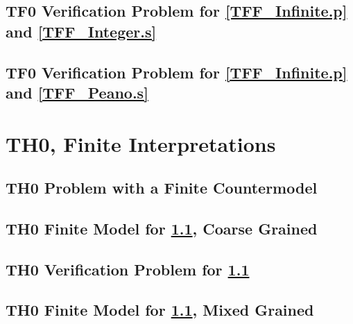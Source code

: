 \documentclass{easychair}
\begin{document}
\newpage
\subsection{TF0 Verification Problem for \ref{TFF_Infinite.p} and \ref{TFF_Integer.s}}
\label{TFF_Integer.s.p}
\begin{small}

\end{small}

\newpage
\subsection{TF0 Verification Problem for \ref{TFF_Infinite.p} and \ref{TFF_Peano.s}}
\label{TFF_Peano.s.p}
\begin{small}

\end{small}

\newpage
\section{TH0, Finite Interpretations}
\label{TH0Finite}

\subsection{TH0 Problem with a Finite Countermodel}
\label{THF_Finite.p}
\begin{small}

\end{small}

\newpage
\subsection{TH0 Finite Model for \ref{THF_Finite.p}, Coarse Grained}
\label{THF_Finite.s}
\begin{small}

\end{small}

\newpage
\subsection{TH0 Verification Problem for \ref{THF_Finite.p}}
\label{THF_Finite.s.p}
\begin{small}

\end{small}

\newpage
\subsection{TH0 Finite Model for \ref{THF_Finite.p}, Mixed Grained}
\label{THF_Finite_Medium.s}
\begin{small}

\end{small}
\end{document}

